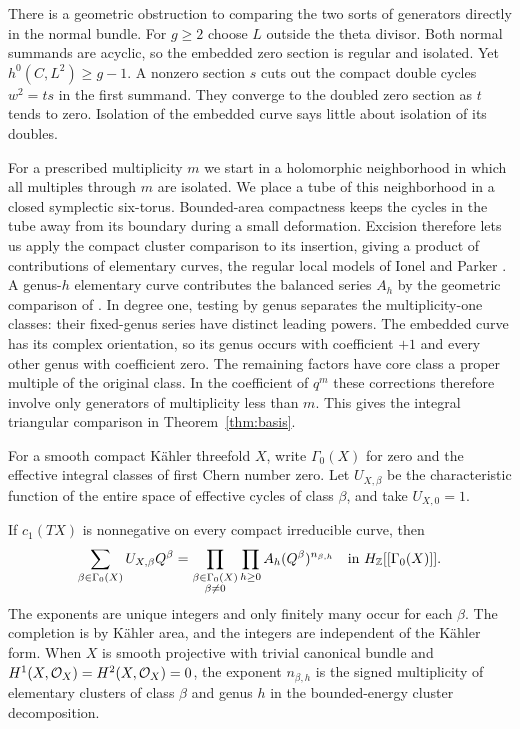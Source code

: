 There is a geometric obstruction to comparing the two sorts of
generators directly in the normal bundle. For $g\ge2$ choose $L$ outside
the theta divisor. Both normal summands are acyclic, so the embedded
zero section is regular and isolated. Yet $h^0(C,L^2)\ge g-1$.
A nonzero section $s$ cuts out the compact double cycles $w^2=ts$ in
the first summand. They converge to the doubled zero section as $t$
tends to zero. Isolation of the embedded curve says little about
isolation of its doubles.

For a prescribed multiplicity $m$ we start in a holomorphic
neighborhood in which all multiples through $m$ are isolated. We place a tube of this neighborhood in a closed symplectic six-torus.
Bounded-area compactness keeps the cycles in the tube away from its
boundary during a small deformation. Excision therefore lets us apply
the compact cluster comparison to its insertion, giving a product of contributions of elementary curves, the regular local
models of Ionel and Parker \cite{IP}. A genus-$h$ elementary curve
contributes the balanced series $A_h$ by the geometric comparison of
\cite[Proposition~3.1]{WueProduct}. In degree one, testing by genus
separates the multiplicity-one classes: their fixed-genus series have
distinct leading powers. The embedded curve has its complex orientation,
so its genus occurs with coefficient $+1$ and every other genus with
coefficient zero. The remaining factors have core
class a proper multiple of the original class. In the coefficient of
$q^m$ these corrections therefore involve only generators of
multiplicity less than $m$. This gives the integral triangular
comparison in Theorem~\ref{thm:basis}.

For a smooth compact Kähler threefold $X$, write $\Gamma_0(X)$ for zero
and the effective integral classes of first Chern number zero. Let
$U_{X,\beta}$ be the characteristic function of the entire space of
effective cycles of class $\beta$, and take $U_{X,0}=1$.
\begin{theorem}\label{thm:compact}
If $c_1(TX)$ is nonnegative on every compact irreducible curve, then
\begin{equation}\label{eq:compact}
 \sum_{\beta\in\Gamma_0(X)}U_{X,\beta}Q^\beta
 =\prod_{\substack{\beta\in\Gamma_0(X)\\ \beta\ne0}}\prod_{h\ge0}
           A_h(Q^\beta)^{n_{\beta,h}}
 \quad\text{in }H_{\mathbb Z}[[\Gamma_0(X)]] .
\end{equation}
The exponents are unique integers and only finitely many occur for each
$\beta$. The completion is by Kähler area, and the integers are independent
of the Kähler form. When $X$ is smooth projective with trivial canonical
bundle and $H^1(X,\mathcal O_X)=H^2(X,\mathcal O_X)=0$, the exponent $n_{\beta,h}$
is the signed multiplicity of elementary clusters of class $\beta$ and
genus $h$ in the bounded-energy cluster decomposition.
\end{theorem}

